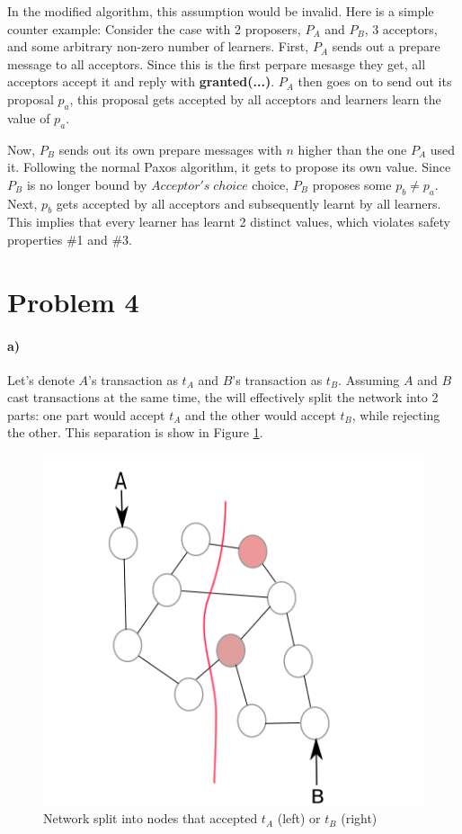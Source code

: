 \documentclass[10pt,letter]{article}
\begin{document}
In the modified algorithm, this assumption would be invalid. Here is a simple counter example: Consider the case with 2 proposers, $P_A$ and $P_B$, 3 acceptors, and some arbitrary non-zero number of learners. First, $P_A$ sends out a prepare message to all acceptors. Since this is the first perpare mesasge they get, all acceptors accept it and reply with \textbf{granted(...)}. $P_A$ then goes on to send out its proposal $p_a$, this proposal gets accepted by all acceptors and learners learn the value of $p_a$.

Now, $P_B$ sends out its own prepare messages with $n$ higher than the one $P_A$ used it. Following the normal Paxos algorithm, it gets to propose its own value. Since $P_B$ is no longer bound by $Acceptor's\; choice$ choice, $P_B$ proposes some $p_b \neq p_a$. Next, $p_b$ gets accepted by all acceptors and subsequently learnt by all learners. This implies that every learner has learnt 2 distinct values, which violates safety properties \#1 and \#3.

\section*{Problem 4}

\paragraph{a)} Let's denote $A$'s transaction as $t_A$ and $B$'s transaction as $t_B$. Assuming $A$ and $B$ cast transactions at the same time, the will effectively split the network into 2 parts: one part would accept $t_A$ and the other would accept $t_B$, while rejecting the other. This separation is show in Figure \ref{fig:split}.

\begin{figure}[h!]
\centering
\includegraphics[scale=0.5,keepaspectratio]{hw8_problem4_a}
\caption{Network split into nodes that accepted $t_A$ (left) or $t_B$ (right)}
\label{fig:split}
\end{figure}
\end{document}
